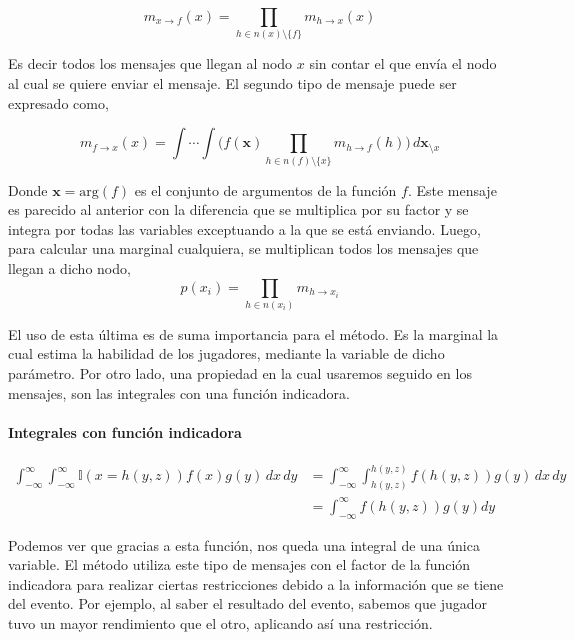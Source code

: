 \documentclass[11pt,twoside,spanish]{report} %
\begin{document}
\begin{equation}\label{eq:m_v_f}
m_{x \rightarrow f}(x) = \prod_{h \in n(x) \setminus \{f\} } m_{h \rightarrow x}(x)
\end{equation}

Es decir todos los mensajes que llegan al nodo $x$ sin contar el que env\'ia el nodo al cual se quiere enviar el mensaje.
El segundo tipo de mensaje puede ser expresado como,

\begin{equation}\label{eq:m_f_v}
m_{f \rightarrow x}(x) = \int \cdots \int \Big( f(\bm{x}) \prod_{h \in n(f) \setminus \{x\} } m_{h \rightarrow f}(h) \Big) \,  d\bm{x}_{\setminus x}
\end{equation}

Donde $\bm{x} = \text{arg}(f)$ es el conjunto de argumentos de la funci\'on $f$.
Este mensaje es parecido al anterior con la diferencia que se multiplica por su factor y se integra por todas las variables exceptuando a la que se est\'a enviando.
Luego, para calcular una marginal cualquiera, se multiplican todos los mensajes que llegan a dicho nodo,
\begin{equation}\label{eq:marginal}
p(x_i) = \prod_{h \in n(x_i)} m_{h \rightarrow x_i}
\end{equation}

El uso de esta \'ultima es de suma importancia para el m\'etodo.
Es la marginal la cual estima la habilidad de los jugadores, mediante la variable de dicho par\'ametro.
Por otro lado, una propiedad en la cual usaremos seguido en los mensajes, son las integrales con una funci\'on indicadora.

\paragraph{Integrales con funci\'on indicadora}
\begin{equation}\label{eq:integral_con_indicadora}
\begin{split}
\int_{-\infty}^{\infty}  \int_{-\infty}^{\infty}  \mathbb{I}(x=h(y,z)) f(x) g(y)\, dx\, dy &=  \int_{-\infty}^{\infty} \int_{h(y,z)}^{h(y,z)} f(h(y,z)) g(y)\, dx\, dy\\
& = \int_{-\infty}^{\infty} f(h(y,z)) g(y) dy
\end{split}
\end{equation}

Podemos ver que gracias a esta funci\'on, nos queda una integral de una \'unica variable.
El m\'etodo utiliza este tipo de mensajes con el factor de la funci\'on indicadora para realizar ciertas restricciones debido a la informaci\'on que se tiene del evento.
Por ejemplo, al saber el resultado del evento, sabemos que jugador tuvo un mayor rendimiento que el otro, aplicando as\'i una restricci\'on.
\end{document}
